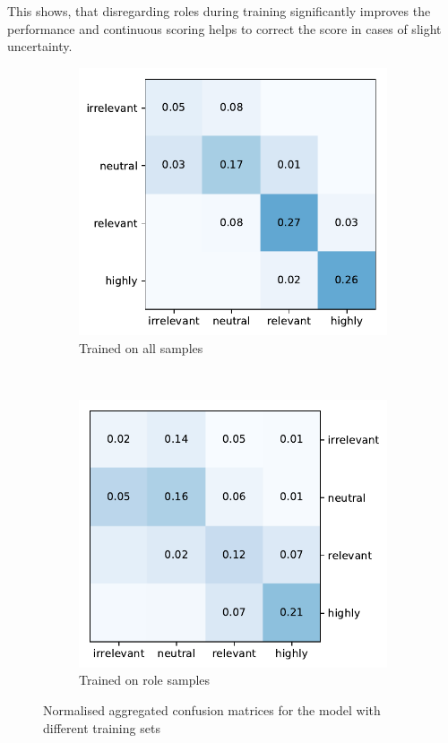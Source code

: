 This shows, that disregarding roles during training significantly improves the performance and continuous scoring helps to correct the score in cases of slight uncertainty.

\begin{figure}
	\begin{subfigure}[t]{0.5\linewidth}
		\centering
		\includegraphics[width=\linewidth]{conf_full}
		\caption{Trained on all samples}
	\end{subfigure}%
	~ 
	\begin{subfigure}[t]{0.5\linewidth}
		\includegraphics[width=\linewidth]{conf_role}
		\caption{Trained on role samples}
	\end{subfigure}
	\caption{Normalised aggregated confusion matrices for the model with different training sets}
	\label{fig:confmatrix}
\end{figure}

